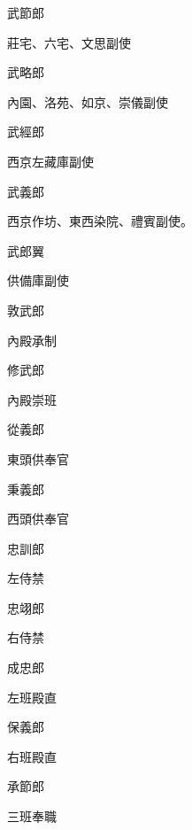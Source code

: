 \begin{pinyinscope}
 武節郎



 莊宅、六宅、文思副使



 武略郎



 內園、洛苑、如京、崇儀副使



 武經郎



 西京左藏庫副使



 武義郎



 西京作坊、東西染院、禮賓副使。



 武郎翼



 供備庫副使



 敦武郎



 內殿承制



 修武郎



 內殿崇班



 從義郎



 東頭供奉官



 秉義郎



 西頭供奉官



 忠訓郎



 左侍禁



 忠翊郎



 右侍禁



 成忠郎



 左班殿直



 保義郎



 右班殿直



 承節郎



 三班奉職




\end{pinyinscope}

